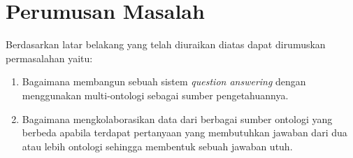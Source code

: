 \section{Perumusan Masalah}
Berdasarkan latar belakang yang telah diuraikan diatas dapat dirumuskan permasalahan yaitu: 
\begin{enumerate}
	\item Bagaimana membangun sebuah sistem \emph{question answering} dengan menggunakan multi-ontologi sebagai sumber pengetahuannya.
	\item Bagaimana mengkolaborasikan data dari berbagai sumber ontologi yang berbeda apabila terdapat pertanyaan yang membutuhkan jawaban dari dua atau lebih ontologi sehingga membentuk sebuah jawaban utuh.
\end{enumerate}